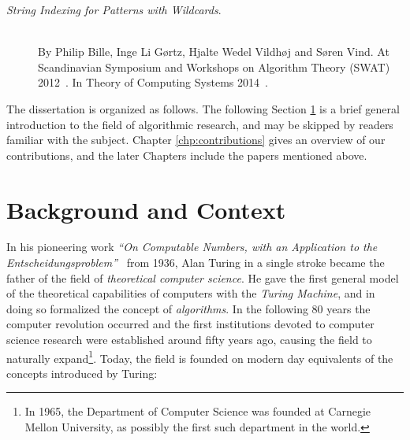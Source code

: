 \begin{description}
    \item[\emph{String Indexing for Patterns with Wildcards}.]~\\
    By Philip Bille, Inge Li Gørtz, Hjalte Wedel Vildhøj and Søren Vind. At Scandinavian Symposium and Workshops on Algorithm Theory (SWAT) 2012~\cite{bille2012string}. In Theory of Computing Systems 2014~\cite{bille2014string}.
\end{description}

The dissertation is organized as follows. 
The following Section \ref{sec:in-back} is a brief general introduction to the field of algorithmic research, and may be skipped by readers familiar with the subject. 
Chapter \ref{chp:contributions} gives an overview of our contributions, and the later Chapters include the papers mentioned above.


\section{Background and Context}\label{sec:in-back}

In his pioneering work \emph{``On Computable Numbers, with an Application to the Entscheidungsproblem''}~\cite{turing1936computable} from 1936, Alan Turing in a single stroke became the father of the field of \emph{theoretical computer science}. He gave the first general model of the theoretical capabilities of computers with the \emph{Turing Machine}, and in doing so formalized the concept of \emph{algorithms}.
In the following 80 years the computer revolution occurred and the first institutions devoted to computer science research were established around fifty years ago, causing the field to naturally expand\footnote{In 1965, the Department of Computer Science was founded at Carnegie Mellon University, as possibly the first such department in the world.}. 
Today, the field is founded on modern day equivalents of the concepts introduced by Turing:

